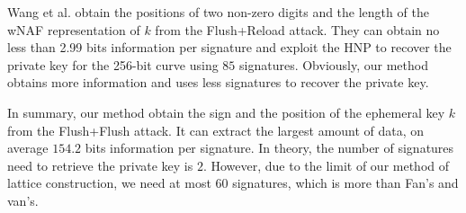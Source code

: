 Wang et al. \cite{Wang2017} obtain the positions of two non-zero digits and the length of the wNAF representation of $k$ from the Flush+Reload attack.
They can obtain no less than 2.99 bits information per signature and exploit the HNP to recover the private key for the 256-bit curve using $85$ signatures.
Obviously, our method obtains more information and uses less signatures to recover the private key.

In summary, our method obtain the sign and the position of the ephemeral key $k$ from the Flush+Flush attack.
It can extract the largest amount of data, on average $154.2$ bits information per signature.
In theory, the number of signatures need to retrieve the private key is $2$.
  However, due to the limit of our method of lattice construction, we need at most $60$ signatures, which is more than Fan's and van's.






























